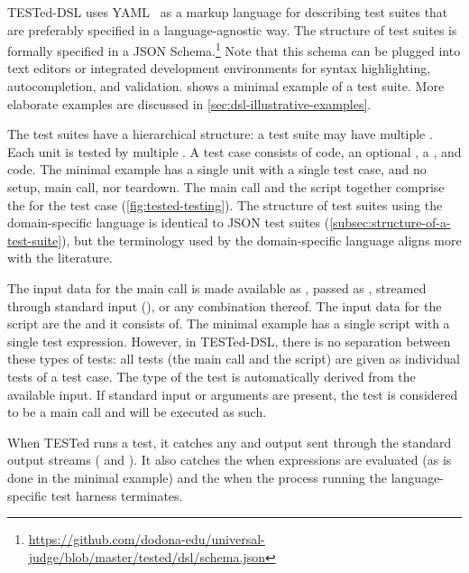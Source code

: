 \documentclass[../main]{subfiles}
\begin{document}
TESTed-DSL uses YAML~\autocite{ben-kikiYAMLAinMarkup2021} as a markup language for describing test suites that are preferably specified in a language-agnostic way.
The structure of test suites is formally specified in a JSON Schema.\footnote{\url{https://github.com/dodona-edu/universal-judge/blob/master/tested/dsl/schema.json}}
Note that this schema can be plugged into text editors or integrated development environments for syntax highlighting, autocompletion, and validation.
 shows a minimal example of a test suite.
More elaborate examples are discussed in \cref{sec:dsl-illustrative-examples}.

The test suites have a hierarchical structure: a test suite may have multiple .
Each unit is tested by multiple .
A test case consists of  code, an optional , a , and  code.
The minimal example has a single unit with a single test case, and no setup, main call, nor teardown.
The main call and the script together comprise the  for the test case (\cref{fig:tested-testing}).
The structure of test suites using the domain-specific language is identical to JSON test suites (\cref{subsec:structure-of-a-test-suite}), but the terminology used by the domain-specific language aligns more with the literature.

The input data for the main call is made available as , passed as , streamed through standard input (), or any combination thereof.
The input data for the script are the  and  it consists of.
The minimal example has a single script with a single test expression.
However, in TESTed-DSL, there is no separation between these types of tests: all tests (the main call and the script) are given as individual tests of a test case.
The type of the test is automatically derived from the available input.
If standard input or arguments are present, the test is considered to be a main call and will be executed as such.

When TESTed runs a test, it catches any  and output sent through the standard output streams ( and ).
It also catches the  when expressions are evaluated (as is done in the minimal example) and the  when the process running the language-specific test harness terminates.
\end{document}

